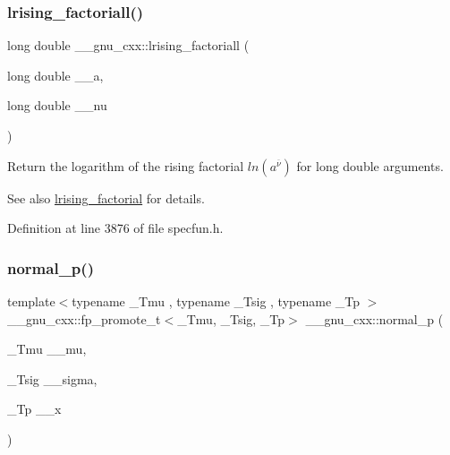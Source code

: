 \subsubsection{\texorpdfstring{lrising\+\_\+factoriall()}{lrising\_factoriall()}}
{\footnotesize\ttfamily long double \+\_\+\+\_\+gnu\+\_\+cxx\+::lrising\+\_\+factoriall (\begin{DoxyParamCaption}\item[{long double}]{\+\_\+\+\_\+a,  }\item[{long double}]{\+\_\+\+\_\+nu }\end{DoxyParamCaption})\hspace{0.3cm}{\ttfamily [inline]}}

Return the logarithm of the rising factorial $ ln(a^{\overline{\nu}}) $ for {\ttfamily  long double } arguments.

\begin{DoxySeeAlso}{See also}
\hyperlink{group__gnu__math__spec__func_ga8912b75b2f7592fb61128c766e7313b9}{lrising\+\_\+factorial} for details. 
\end{DoxySeeAlso}


Definition at line 3876 of file specfun.\+h.

\mbox{\label{group__gnu__math__spec__func_gaeb735b0fb98c7684ba61b8940f50193c}} 
\subsubsection{\texorpdfstring{normal\+\_\+p()}{normal\_p()}}
{\footnotesize\ttfamily template$<$typename \+\_\+\+Tmu , typename \+\_\+\+Tsig , typename \+\_\+\+Tp $>$ \\
\+\_\+\+\_\+gnu\+\_\+cxx\+::fp\+\_\+promote\+\_\+t$<$\+\_\+\+Tmu, \+\_\+\+Tsig, \+\_\+\+Tp$>$ \+\_\+\+\_\+gnu\+\_\+cxx\+::normal\+\_\+p (\begin{DoxyParamCaption}\item[{\+\_\+\+Tmu}]{\+\_\+\+\_\+mu,  }\item[{\+\_\+\+Tsig}]{\+\_\+\+\_\+sigma,  }\item[{\+\_\+\+Tp}]{\+\_\+\+\_\+x }\end{DoxyParamCaption})\hspace{0.3cm}{\ttfamily [inline]}}



